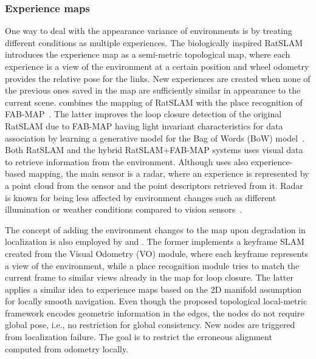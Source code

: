 \subsubsection{Experience maps}
\label{sec:discussion:appearance:exp-maps}

One way to deal with the appearance variance of environments is by treating different conditions as multiple experiences.
The biologically inspired RatSLAM~\parencite{ball-et-al:2013:9} introduces the experience map as a semi-metric topological map, where each experience is a view of the environment at a certain position and wheel odometry provides the relative pose for the links. New experiences are created when none of the previous ones saved in the map are sufficiently similar in appearance to the current scene.
\cite{glover-et-al:2010:5509547} combines the mapping of RatSLAM with the place recognition of FAB-MAP~\parencite{discussion:fab-map}. The latter improves the loop closure detection of the original RatSLAM due to FAB-MAP having light invariant characteristics for data association by learning a generative model for the Bag of Words (BoW) model~\parencite{discussion:bow}.
Both RatSLAM and the hybrid RatSLAM+FAB-MAP systems uses visual data to retrieve information from the environment.
Although \cite{martini-et-al:2020:s20216002} uses also experience-based mapping, the main sensor is a radar, where an experience is represented by a point cloud from the sensor and the point descriptors retrieved from it. Radar is known for being less affected by environment changes such as different illumination or weather conditions compared to vision sensors~\parencite{hong-et-al:2022:02783649221080483}.

The concept of adding the environment changes to the map upon degradation in localization is also employed by \cite{konolige-bowman:2009:5354121} and \cite{tang-et-al:2019:7}.
The former implements a keyframe SLAM created from the Visual Odometry (VO) module, where each keyframe represents a view of the environment, while a place recognition module tries to match the current frame to similar views already in the map for loop closure.
The latter applies a similar idea to experience maps based on the 2D manifold assumption for locally smooth navigation. Even though the proposed topological local-metric framework encodes geometric information in the edges, the nodes do not require global pose, i.e., no restriction for global consistency. New nodes are triggered from localization failure. The goal is to restrict the erroneous alignment computed from odometry locally.

